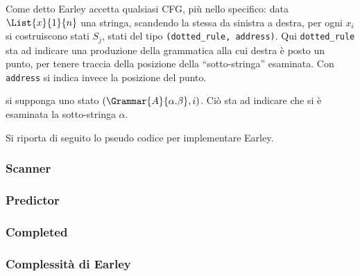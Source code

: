 \documentclass{subfiles}
\begin{document}
Come detto Earley accetta qualsiasi CFG, più nello specifico: data \(\List{x}{1}{n}\) una stringa,
scandendo la stessa da sinistra a destra, per ogni \(x_{i}\) si costruiscono stati \(S_{j}\), stati del tipo \lstinline{(dotted_rule, address)}.
Qui \lstinline{dotted_rule} sta ad indicare una produzione della grammatica alla cui destra è posto un punto,
per tenere traccia della posizione della ``sotto-stringa'' esaminata. Con \lstinline{address} si indica invece la posizione del punto.

\begin{Example*}
    si supponga uno stato \((\Grammar{A}{\alpha . \beta}, i)\). Ciò sta ad indicare che si è esaminata la sotto-stringa \(\alpha\).
\end{Example*}

\noindent Si riporta di seguito lo pseudo codice per implementare Earley.


\subsubsection{Scanner}


\subsubsection{Predictor}


\subsubsection{Completed}


\subsubsection{Complessità di Earley}

\end{document}
